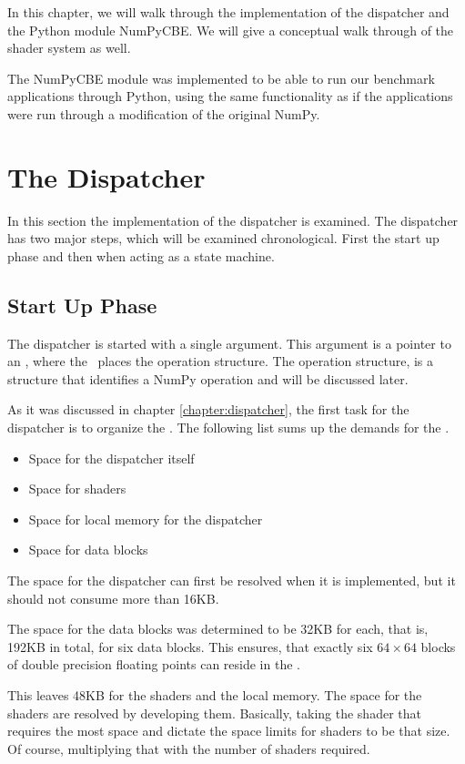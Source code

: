 In this chapter, we will walk through the implementation of the
dispatcher and the Python module NumPyCBE. We will give a
conceptual walk through of the shader system as well.

The NumPyCBE module was implemented to be able to run our benchmark applications
through Python, using the same functionality as if the applications
were run through a modification of the original NumPy.

\section{The Dispatcher}

In this section the implementation of the dispatcher is examined. The
dispatcher has two major steps, which will be examined
chronological. First the start up phase and then when acting as a
state machine.

\subsection{Start Up Phase}

The dispatcher is started with a single argument. This argument is a
pointer to an \EA{}, where the \PPE\ places the operation
structure. The operation structure, is a structure that identifies a
NumPy operation and will be discussed later.

As it was discussed in chapter \ref{chapter:dispatcher}, the first
task for the dispatcher is to organize the \LS{}. The following list
sums up the demands for the \LS{}.

\begin{itemize}
\item{Space for the dispatcher itself}
\item{Space for shaders}
\item{Space for local memory for the dispatcher}
\item{Space for data blocks}
\end{itemize}

The space for the dispatcher can first be resolved when it is
implemented, but it should not consume more than 16KB.

The space for the data blocks was determined to be 32KB for each, that
is, 192KB in total, for six data blocks. This ensures, that exactly
six $64 \times 64$ blocks of double precision floating points can
reside in the \LS{}.

This leaves 48KB for the shaders and the local memory. The space for
the shaders are resolved by developing them. Basically, taking the
shader that requires the most space and dictate the space limits for
shaders to be that size. Of course, multiplying that with the number
of shaders required.

